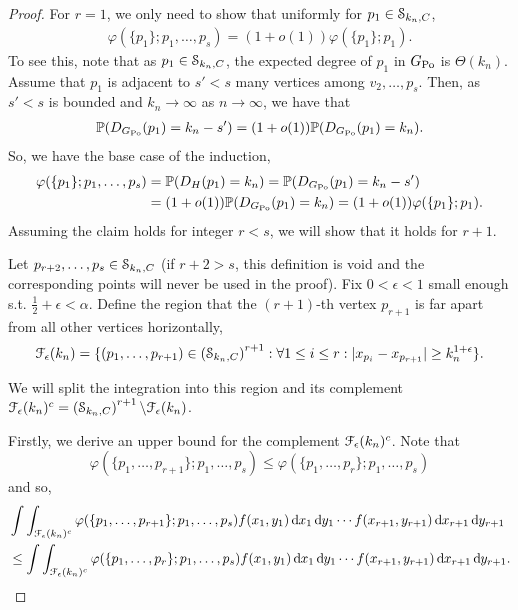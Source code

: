 \begin{proof}
For $r=1$, we only need to show that uniformly for $p_1 \in \mathcal{S}_{k_n,C}$,
\begin{align*}
\varphi(\{p_1\};p_1,\dots,p_s) = (1+o(1))\varphi(\{p_1\};p_1).
\end{align*}
To see this, note that as $p_1\in \mathcal{S}_{k_n,C}$, the expected degree of $p_1$ in $G_{{\mathrm{Po}}}$ is $\Theta(k_n)$. Assume that $p_1$ is adjacent to $s'<s$ many vertices among $v_2,\dots,p_s$. Then, as $s'<s$ is bounded and $k_n \rightarrow \infty$ as $n\rightarrow \infty$,  we have that
\begin{align*}
\mathbb{P}(D_{G_{{\mathrm{Po}}}}(p_1)=k_n-s') = (1+o(1))\mathbb{P}(D_{G_{{\mathrm{Po}}}}(p_1)=k_n).
\end{align*}
So, we have the base case of the induction,
\begin{align*}
\varphi(\{p_1\};p_1,\dots,p_s)&=\mathbb{P}(D_H(p_1)=k_n)
= \mathbb{P}(D_{G_{{\mathrm{Po}}}}(p_1)=k_n-s')\\
&= (1+o(1))\mathbb{P}(D_{G_{{\mathrm{Po}}}}(p_1)=k_n)=(1+o(1))\varphi(\{p_1\};p_1).
\end{align*}
Assuming the claim holds for integer $r <s$, we will show that it holds for $r+1$.

Let $p_{r+2},\dots,p_s\in \mathcal{S}_{k_n,C}$ (if $r+2>s$, this definition is void and the corresponding points will never be used in the proof).
Fix $0<\epsilon<1$ small enough s.t. $\frac{1}{2}+\epsilon<\alpha$. Define the region that the $(r+1)$-th vertex $p_{r+1}$ is far apart from all other vertices horizontally,
$$\mathcal{F}_\epsilon(k_n)=\{(p_1,\dots,p_{r+1}) \in \left(\mathcal{S}_{k_n,C}\right)^{r+1}: \forall 1\leq i \leq r: |x_{p_i}-x_{p_{r+1}}|\geq k_n^{1+\epsilon}\}.$$

We will split the integration into this region and its complement $\mathcal{F}_\epsilon(k_n)^c = \left(\mathcal{S}_{k_n,C}\right)^{r+1} \backslash \mathcal{F}_\epsilon(k_n)$.

Firstly, we derive an upper bound for the complement $\mathcal{F}_\epsilon(k_n)^c$.	Note that $$\varphi(\{p_1,\dots,p_{r+1}\};p_1,\dots,p_s) \leq \varphi(\{p_1,\dots,p_r\};p_1,\dots,p_s)$$
and so,
\begin{align*}
	&\int \int_{\mathcal{F}_\epsilon(k_n)^c} \varphi(\{p_1,\dots,p_{r+1}\};p_1,\dots,p_s)
		f(x_1,y_1) \operatorname{\mathrm{d}\hspace{-2pt}} x_1 \operatorname{\mathrm{d}\hspace{-2pt}} y_1 \cdots f(x_{r+1},y_{r+1})\operatorname{\mathrm{d}\hspace{-2pt}} x_{r+1} \operatorname{\mathrm{d}\hspace{-2pt}} y_{r+1}\\
	&\leq \int \int_{\mathcal{F}_\epsilon(k_n)^c} \varphi(\{p_1,\dots,p_r\};p_1,\dots,p_s)
		f(x_1,y_1) \operatorname{\mathrm{d}\hspace{-2pt}} x_1 \operatorname{\mathrm{d}\hspace{-2pt}} y_1 \cdots f(x_{r+1},y_{r+1})\operatorname{\mathrm{d}\hspace{-2pt}} x_{r+1} \operatorname{\mathrm{d}\hspace{-2pt}} y_{r+1}.
\end{align*}


\end{proof}
